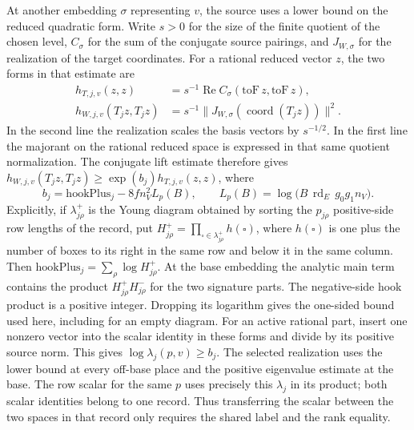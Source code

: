 At another embedding $\sigma$ representing $v$, the source uses a
lower bound on the reduced quadratic form. Write $s>0$ for the size of
the finite quotient of the chosen level, $C_\sigma$ for the sum of
the conjugate source pairings, and $J_{W,\sigma}$ for the realization
of the target coordinates. For a rational reduced vector $z$, the two
forms in that estimate are
\begin{align*}
 h_{T,j,v}(z,z)
   &=s^{-1}\operatorname{Re} C_\sigma(\mathrm{toF}\,z,\mathrm{toF}\,z),\\
 h_{W,j,v}(T_jz,T_jz)
   &=s^{-1}\|J_{W,\sigma}(\operatorname{coord}(T_jz))\|^2 .
\end{align*}
In the second line the realization scales the basis vectors by
$s^{-1/2}$. In the first line the majorant on the rational reduced
space is expressed in that same quotient normalization. The conjugate
lift estimate therefore gives $h_{W,j,v}(T_jz,T_jz)\ge
\exp(b_j)h_{T,j,v}(z,z)$, where
\[
 b_j=\mathrm{hookPlus}_j-8fn_V^2 L_p(B),\qquad
 L_p(B)=\log\!\bigl(B\,\operatorname{rd}_E\,g_0g_1 n_V\bigr).
\]
Explicitly, if $\lambda^+_{j\rho}$ is the Young diagram obtained by
sorting the $p_{j\rho}$ positive-side row lengths of the record, put
$H^+_{j\rho}=\prod_{\square\in\lambda^+_{j\rho}}h(\square)$, where
$h(\square)$ is one plus the number of boxes to its right in the same row
and below it in the same column.
Then $\mathrm{hookPlus}_j=\sum_\rho\log H^+_{j\rho}$.
At the base embedding the analytic main term contains the product
$H^+_{j\rho}H^-_{j\rho}$ for the two signature parts. The negative-side
hook product is a positive integer. Dropping its logarithm gives the
one-sided bound used here, including for an empty diagram.
For an active rational part, insert one nonzero vector into the scalar
identity in these forms and divide by its positive source norm.
This gives $\log\lambda_j(p,v)\ge b_j$. The selected realization uses
the lower bound at every off-base place and the positive eigenvalue
estimate at the base. The row scalar for the same $p$ uses precisely
this $\lambda_j$ in its product; both scalar identities belong to
one record. Thus transferring the scalar between the two spaces in
that record only requires the shared label and the rank equality.


